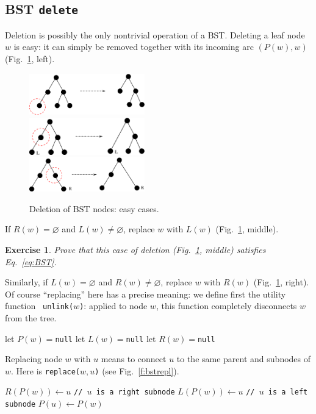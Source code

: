 \documentclass[a4paper]{book}
\theoremstyle{changebreak}                %
\newtheorem{ex}[result]{Exercise}
\begin{document}
\subsection{BST {\tt delete}}
Deletion is possibly the only nontrivial operation 
of a BST. Deleting a leaf node $w$ is easy: it can simply
be removed together with its incoming arc $(P(w), w)$
(Fig.~\ref{f:bstdel}, left).
\begin{figure}[!ht]
\begin{center}
\includegraphics[width=5cm]{deleteleaf} \\ [0.5em]
\includegraphics[width=5cm]{deletenoright} \\ [0.5em]
\includegraphics[width=5cm]{deletenoleft}
\end{center}
\caption{Deletion of BST nodes: easy cases.}
\label{f:bstdel}
\end{figure}
If $R(w)=\varnothing$ and $L(w)\not=\varnothing$, replace $w$ with
$L(w)$ (Fig.~\ref{f:bstdel}, middle).
\begin{ex}
Prove that this case of deletion (Fig.~\ref{f:bstdel}, middle)
satisfies Eq.~\eqref{eq:BST}.
\end{ex}
Similarly, if $L(w)=\varnothing$ and $R(w)\not=\varnothing$, replace
$w$ with $R(w)$ (Fig.~\ref{f:bstdel}, right).  Of course ``replacing''
here has a precise meaning: we define first the utility function {\tt
  unlink($w$)}: applied to node $w$, this function
completely disconnects $w$ from the tree.
\begin{algorithmic}[1]
\STATE let $P(w)=${\tt null}
\STATE let $L(w)=${\tt null}
\STATE let $R(w)=${\tt null}
\end{algorithmic}
Replacing node $w$ with $u$ means to connect $u$ to the same parent
and subnodes of $w$. Here is {\tt replace($w,u$)} (see
Fig.~\ref{f:bstrepl}).
\begin{algorithmic}[1]
    \STATE $R(P(w))\leftarrow u$ {\tt // $u$ is a right subnode}
  \ELSE
    \STATE $L(P(w))\leftarrow u$ {\tt // $u$ is a left subnode}
  \ENDIF
    \STATE $P(u)\leftarrow P(w)$
  \ENDIF
\end{algorithmic}
\end{document}
